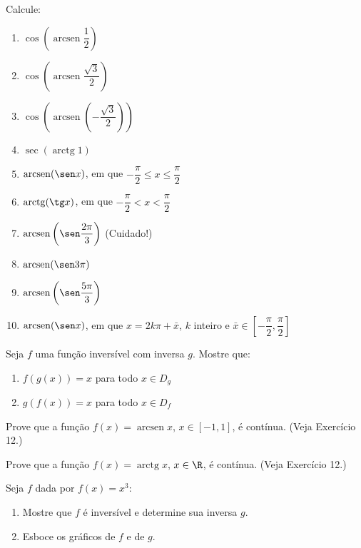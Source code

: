 \begin{exercicio}[3]
Calcule:
\begin{enumerate}[label=\alph*)]
    \item $\cos \left(\operatorname{arcsen} \dfrac{1}{2}\right)$
    \item $\cos \left(\operatorname{arcsen} \dfrac{\sqrt{3}}{2}\right)$
    \item $\cos \left(\operatorname{arcsen} \left(-\dfrac{\sqrt{3}}{2}\right)\right)$
    \item $\sec (\operatorname{arctg} 1)$
    \item $\operatorname{arcsen} (\sen x)$, em que $-\dfrac{\pi}{2} \le x \le \dfrac{\pi}{2}$
    \item $\operatorname{arctg} (\tg x)$, em que $-\dfrac{\pi}{2} < x < \dfrac{\pi}{2}$
    \item $\operatorname{arcsen} \left(\sen \dfrac{2\pi}{3}\right)$ (Cuidado!)
    \item $\operatorname{arcsen} (\sen 3\pi)$
    \item $\operatorname{arcsen} \left(\sen \dfrac{5\pi}{3}\right)$
    \item $\operatorname{arcsen} (\sen x)$, em que $x = 2k\pi + \bar{x}$, $k$ inteiro e $\bar{x} \in \left[-\dfrac{\pi}{2}, \dfrac{\pi}{2}\right]$
\end{enumerate}
\end{exercicio}

\begin{exercicio}[4]
Seja $f$ uma função inversível com inversa $g$. Mostre que:
\begin{enumerate}[label=\alph*)]
    \item $f(g(x)) = x$ para todo $x \in D_g$
    \item $g(f(x)) = x$ para todo $x \in D_f$
\end{enumerate}
\end{exercicio}

\begin{exercicio}[5]
Prove que a função $f(x) = \operatorname{arcsen} x$, $x \in [-1, 1]$, é contínua. (Veja Exercício 12.)
\end{exercicio}

\begin{exercicio}[6]
Prove que a função $f(x) = \operatorname{arctg} x$, $x \in \R$, é contínua. (Veja Exercício 12.)
\end{exercicio}

\begin{exercicio}[7]
Seja $f$ dada por $f(x) = x^3$:
\begin{enumerate}[label=\alph*)]
    \item Mostre que $f$ é inversível e determine sua inversa $g$.
    \item Esboce os gráficos de $f$ e de $g$.
\end{enumerate}
\end{exercicio}

